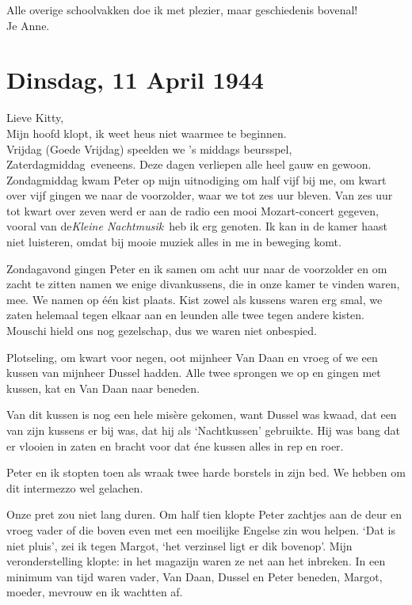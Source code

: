 \documentclass{book}
\begin{document}
Alle overige schoolvakken doe ik met plezier, maar geschiedenis
bovenal!\\Je Anne.

\chapter{Dinsdag, 11 April 1944}

Lieve Kitty,\\Mijn hoofd klopt, ik weet heus niet waarmee te
beginnen.\\Vrijdag (Goede Vrijdag) speelden we 's middags beursspel,
Zaterdagmiddag~eveneens. Deze dagen verliepen alle heel gauw en gewoon.
Zondagmiddag kwam Peter op mijn uitnodiging om half vijf bij me, om
kwart over vijf gingen we naar de voorzolder, waar we tot zes uur
bleven. Van zes uur tot kwart over zeven werd er aan de radio een mooi
Mozart-concert gegeven, vooral van de\emph{Kleine Nachtmusik}~heb ik erg
genoten. Ik kan in de kamer haast niet luisteren, omdat bij mooie muziek
alles in me in beweging komt.

Zondagavond gingen Peter en ik samen om acht uur naar de voorzolder en
om zacht te zitten namen we enige divankussens, die in onze kamer te
vinden waren, mee. We namen op één kist plaats. Kist zowel als kussens
waren erg smal, we zaten helemaal tegen elkaar aan en leunden alle twee
tegen andere kisten. Mouschi hield ons nog gezelschap, dus we waren niet
onbespied.

Plotseling, om kwart voor negen, oot mijnheer Van Daan en vroeg of we
een kussen van mijnheer Dussel hadden. Alle twee sprongen we op en
gingen met kussen, kat en Van Daan naar beneden.

Van dit kussen is nog een hele misère gekomen, want Dussel was kwaad,
dat een van zijn kussens er bij was, dat hij als `Nachtkussen'
gebruikte. Hij was bang dat er vlooien in zaten en bracht voor dat éne
kussen alles in rep en roer.

Peter en ik stopten toen als wraak twee harde borstels in zijn bed. We
hebben om dit intermezzo wel gelachen.

Onze pret zou niet lang duren. Om half tien klopte Peter zachtjes aan de
deur en vroeg vader of die boven even met een moeilijke Engelse zin wou
helpen. `Dat is niet pluis', zei ik tegen Margot, `het verzinsel ligt er
dik bovenop'. Mijn veronderstelling klopte: in het magazijn waren ze net
aan het inbreken. In een minimum van tijd waren vader, Van Daan, Dussel
en Peter beneden, Margot, moeder, mevrouw en ik wachtten af.
\end{document}
